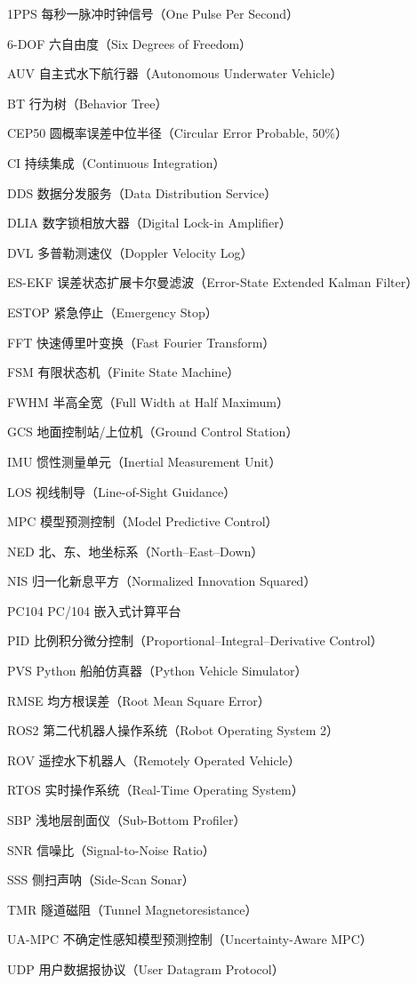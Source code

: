 
\begin{denotation}[2.5cm]
  \item[1PPS] 每秒一脉冲时钟信号（One Pulse Per Second）
  \item[6-DOF] 六自由度（Six Degrees of Freedom）
  \item[AUV] 自主式水下航行器（Autonomous Underwater Vehicle）
  \item[BT] 行为树（Behavior Tree）
  \item[CEP50] 圆概率误差中位半径（Circular Error Probable, 50\%）
  \item[CI] 持续集成（Continuous Integration）
  \item[DDS] 数据分发服务（Data Distribution Service）
  \item[DLIA] 数字锁相放大器（Digital Lock-in Amplifier）
  \item[DVL] 多普勒测速仪（Doppler Velocity Log）
  \item[ES-EKF] 误差状态扩展卡尔曼滤波（Error-State Extended Kalman Filter）
  \item[ESTOP] 紧急停止（Emergency Stop）
  \item[FFT] 快速傅里叶变换（Fast Fourier Transform）
  \item[FSM] 有限状态机（Finite State Machine）
  \item[FWHM] 半高全宽（Full Width at Half Maximum）
  \item[GCS] 地面控制站/上位机（Ground Control Station）
  \item[IMU] 惯性测量单元（Inertial Measurement Unit）
  \item[LOS] 视线制导（Line-of-Sight Guidance）
  \item[MPC] 模型预测控制（Model Predictive Control）
  \item[NED] 北、东、地坐标系（North--East--Down）
  \item[NIS] 归一化新息平方（Normalized Innovation Squared）
  \item[PC104] PC/104 嵌入式计算平台
  \item[PID] 比例积分微分控制（Proportional--Integral--Derivative Control）
  \item[PVS] Python 船舶仿真器（Python Vehicle Simulator）
  \item[RMSE] 均方根误差（Root Mean Square Error）
  \item[ROS2] 第二代机器人操作系统（Robot Operating System 2）
  \item[ROV] 遥控水下机器人（Remotely Operated Vehicle）
  \item[RTOS] 实时操作系统（Real-Time Operating System）
  \item[SBP] 浅地层剖面仪（Sub-Bottom Profiler）
  \item[SNR] 信噪比（Signal-to-Noise Ratio）
  \item[SSS] 侧扫声呐（Side-Scan Sonar）
  \item[TMR] 隧道磁阻（Tunnel Magnetoresistance）
  \item[UA-MPC] 不确定性感知模型预测控制（Uncertainty-Aware MPC）
  \item[UDP] 用户数据报协议（User Datagram Protocol）


\end{denotation}
